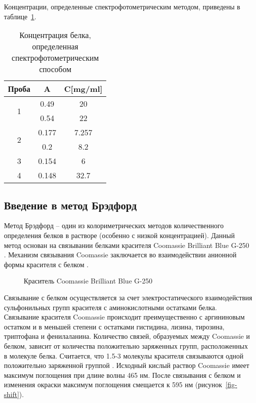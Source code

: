 Концентрации, определенные спектрофотометрическим методом,
приведены в таблице~\ref{table-spm}.

\begin{table}[htbp]
\caption{Концентрация белка, определенная спектрофотометрическим способом}
\begin{tabular}{|c|c|c|}
\hline
Проба & A & C[mg/ml] \\
\hline
\multirow{2}{*}{1} & 0.49 & 20 \\
& 0.54 & 22 \\
\hline
\multirow{2}{*}{2} & 0.177 & 7.257 \\
& 0.2 & 8.2 \\
\hline
3 & 0.154 & 6 \\
\hline
4 & 0.148 & 32.7 \\
\hline
\end{tabular}
\label{table-spm}
\end{table}

\subsection{Введение в метод Брэдфорд}
Метод Брэдфорд -- один из колориметрических методов количественного определения белков в растворе
(особенно с низкой концентрацией).
Данный метод основан на связывании белками красителя Coomassie Brilliant Blue G-250 \cite{bradford-1}.
Механизм связывания Coomassie заключается во взаимодействии анионной формы красителя с белком \cite{bradford-2}.

\begin{figure}[htbp]
\def\svgwidth{0.7\linewidth}
\caption{Краситель Coomassie Brilliant Blue G-250}
\end{figure}

Связывание с белком осуществляется за счет электростатического взаимодействия сульфонильных групп
красителя с аминокислотными остатками белка.
Связывание красителя Coomassie происходит преимущественно с аргининовым остатком и в меньшей степени с
остатками гистидина, лизина, тирозина, триптофана и фенилаланина.
Количество связей, образуемых между Coomassie и белком, зависит от количества положительно заряженных групп,
расположенных в молекуле белка.
Считается, что 1.5-3 молекулы красителя связываются одной положительно заряженной группой \cite{bradford-3}.
Исходный кислый раствор Coomassie имеет максимум поглощения при длине волны 465 нм.
После связывания с белком и изменения окраски максимум поглощения смещается к 595 нм
(рисунок~\ref{fig-shift}).

